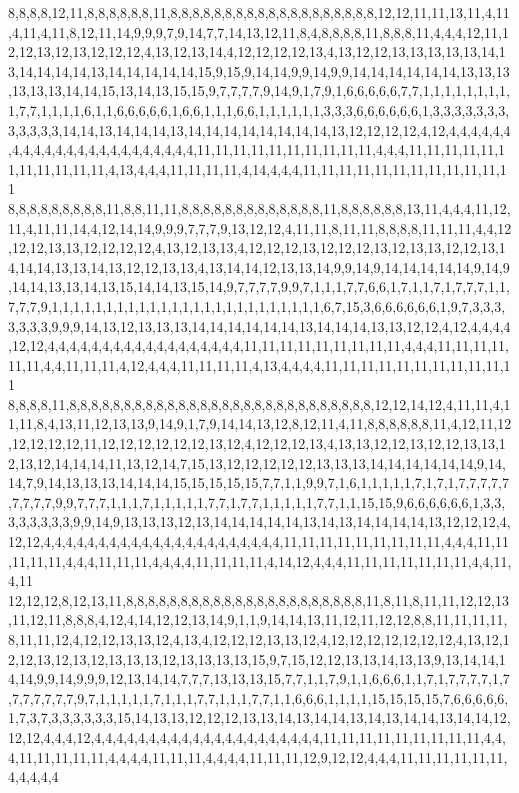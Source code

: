 8,8,8,8,12,11,8,8,8,8,8,8,11,8,8,8,8,8,8,8,8,8,8,8,8,8,8,8,8,8,8,8,12,12,11,11,13,11,4,11,4,11,4,11,8,12,11,14,9,9,9,7,9,14,7,7,14,13,12,11,8,4,8,8,8,8,11,8,8,8,11,4,4,4,12,11,12,12,13,12,13,12,12,12,4,13,12,13,14,4,12,12,12,12,13,4,13,12,12,13,13,13,13,13,14,13,14,14,14,14,13,14,14,14,14,14,15,9,15,9,14,14,9,9,14,9,9,14,14,14,14,14,14,13,13,13,13,13,13,14,14,15,13,14,13,15,15,9,7,7,7,7,9,14,9,1,7,9,1,6,6,6,6,6,7,7,1,1,1,1,1,1,1,1,1,7,7,1,1,1,1,6,1,1,6,6,6,6,6,1,6,6,1,1,1,6,6,1,1,1,1,1,1,3,3,3,6,6,6,6,6,6,1,3,3,3,3,3,3,3,3,3,3,3,3,14,14,13,14,14,14,13,14,14,14,14,14,14,14,14,13,12,12,12,12,4,12,4,4,4,4,4,4,4,4,4,4,4,4,4,4,4,4,4,4,4,4,4,4,4,11,11,11,11,11,11,11,11,11,11,4,4,4,11,11,11,11,11,11,11,11,11,11,11,4,13,4,4,4,11,11,11,11,4,14,4,4,4,11,11,11,11,11,11,11,11,11,11,11,11
8,8,8,8,8,8,8,8,8,11,8,8,11,11,8,8,8,8,8,8,8,8,8,8,8,8,8,11,8,8,8,8,8,8,13,11,4,4,4,11,12,11,4,11,11,14,4,12,14,14,9,9,9,7,7,7,9,13,12,12,4,11,11,8,11,11,8,8,8,8,11,11,11,4,4,12,12,12,13,13,12,12,12,12,4,13,12,13,13,4,12,12,12,13,12,12,12,13,12,13,13,12,12,13,14,14,14,13,13,14,13,12,12,13,13,4,13,14,14,12,13,13,14,9,9,14,9,14,14,14,14,14,9,14,9,14,14,13,13,14,13,15,14,14,13,15,14,9,7,7,7,7,9,9,7,1,1,1,7,7,6,6,1,7,1,1,7,1,7,7,7,1,1,7,7,7,9,1,1,1,1,1,1,1,1,1,1,1,1,1,1,1,1,1,1,1,1,1,1,1,1,1,6,7,15,3,6,6,6,6,6,6,1,9,7,3,3,3,3,3,3,3,9,9,9,14,13,12,13,13,13,14,14,14,14,14,14,13,14,14,14,13,13,12,12,4,12,4,4,4,4,12,12,4,4,4,4,4,4,4,4,4,4,4,4,4,4,4,4,4,4,11,11,11,11,11,11,11,11,11,4,4,4,11,11,11,11,11,11,4,4,11,11,11,4,12,4,4,4,11,11,11,11,4,13,4,4,4,4,11,11,11,11,11,11,11,11,11,11,11
8,8,8,8,11,8,8,8,8,8,8,8,8,8,8,8,8,8,8,8,8,8,8,8,8,8,8,8,8,8,8,8,8,12,12,14,12,4,11,11,4,11,11,8,4,13,11,12,13,13,9,14,9,1,7,9,14,14,13,12,8,12,11,4,11,8,8,8,8,8,8,11,4,12,11,12,12,12,12,12,11,12,12,12,12,12,12,13,12,4,12,12,12,13,4,13,13,12,12,13,12,12,13,13,12,13,12,14,14,14,11,13,12,14,7,15,13,12,12,12,12,12,13,13,13,14,14,14,14,14,14,9,14,14,7,9,14,13,13,13,14,14,14,15,15,15,15,15,7,7,1,1,9,9,7,1,6,1,1,1,1,1,7,1,7,1,7,7,7,7,7,7,7,7,7,9,9,7,7,7,1,1,1,7,1,1,1,1,1,7,7,1,7,7,1,1,1,1,1,7,7,1,1,15,15,9,6,6,6,6,6,6,1,3,3,3,3,3,3,3,3,9,9,14,9,13,13,13,12,13,14,14,14,14,14,13,14,13,14,14,14,14,13,12,12,12,4,12,12,4,4,4,4,4,4,4,4,4,4,4,4,4,4,4,4,4,4,4,4,4,4,11,11,11,11,11,11,11,11,11,4,4,4,11,11,11,11,11,4,4,4,11,11,11,4,4,4,4,11,11,11,11,4,14,12,4,4,4,11,11,11,11,11,11,11,4,4,11,4,11
12,12,12,8,12,13,11,8,8,8,8,8,8,8,8,8,8,8,8,8,8,8,8,8,8,8,8,8,8,11,8,11,8,11,11,12,12,13,11,12,11,8,8,8,4,12,4,14,12,12,13,14,9,1,1,9,14,14,13,11,12,11,12,12,8,8,11,11,11,11,8,11,11,12,4,12,12,13,13,12,4,13,4,12,12,12,13,13,12,4,12,12,12,12,12,12,12,4,13,12,12,12,13,12,13,12,13,13,13,12,13,13,13,13,15,9,7,15,12,12,13,13,14,13,13,9,13,14,14,14,14,9,9,14,9,9,9,12,13,14,14,7,7,7,13,13,13,15,7,7,1,1,7,9,1,1,6,6,6,1,1,7,1,7,7,7,7,1,7,7,7,7,7,7,7,9,7,1,1,1,1,1,7,1,1,1,7,7,1,1,1,7,7,1,1,6,6,6,1,1,1,1,15,15,15,15,7,6,6,6,6,6,1,7,3,7,3,3,3,3,3,3,15,14,13,13,12,12,12,13,13,14,13,14,14,13,14,13,14,14,13,14,14,12,12,12,4,4,4,12,4,4,4,4,4,4,4,4,4,4,4,4,4,4,4,4,4,4,4,4,4,11,11,11,11,11,11,11,11,11,4,4,4,11,11,11,11,11,4,4,4,4,11,11,11,4,4,4,4,11,11,11,12,9,12,12,4,4,4,11,11,11,11,11,11,4,4,4,4,4
